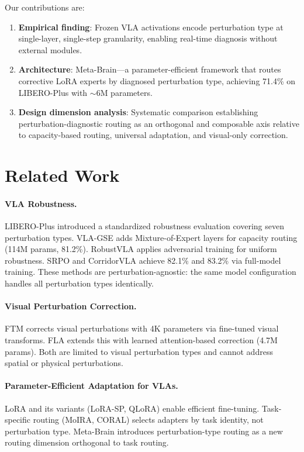 \documentclass[letterpaper]{article}
\begin{document}
Our contributions are:
\begin{enumerate}
\item \textbf{Empirical finding}: Frozen VLA activations encode perturbation type at single-layer, single-step granularity, enabling real-time diagnosis without external modules.
\item \textbf{Architecture}: Meta-Brain---a parameter-efficient framework that routes corrective LoRA experts by diagnosed perturbation type, achieving 71.4\% on LIBERO-Plus with ${\sim}6$M parameters.
\item \textbf{Design dimension analysis}: Systematic comparison establishing perturbation-diagnostic routing as an orthogonal and composable axis relative to capacity-based routing, universal adaptation, and visual-only correction.
\end{enumerate}

\section{Related Work}

\paragraph{VLA Robustness.}
LIBERO-Plus introduced a standardized robustness evaluation covering seven perturbation types.
VLA-GSE adds Mixture-of-Expert layers for capacity routing (114M params, 81.2\%).
RobustVLA applies adversarial training for uniform robustness.
SRPO and CorridorVLA achieve 82.1\% and 83.2\% via full-model training.
These methods are perturbation-agnostic: the same model configuration handles all perturbation types identically.

\paragraph{Visual Perturbation Correction.}
FTM corrects visual perturbations with 4K parameters via fine-tuned visual transforms.
FLA extends this with learned attention-based correction (4.7M params).
Both are limited to visual perturbation types and cannot address spatial or physical perturbations.

\paragraph{Parameter-Efficient Adaptation for VLAs.}
LoRA and its variants (LoRA-SP, QLoRA) enable efficient fine-tuning.
Task-specific routing (MoIRA, CORAL) selects adapters by task identity, not perturbation type.
Meta-Brain introduces perturbation-type routing as a new routing dimension orthogonal to task routing.
\end{document}
